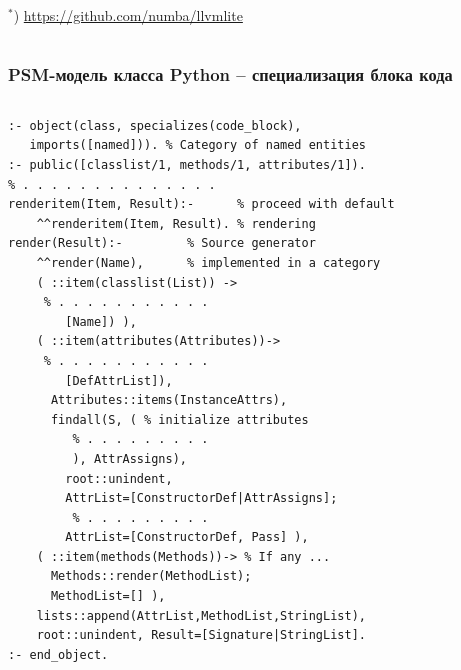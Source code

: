 \documentclass[10pt]{beamer}
\begin{document}
\begin{frame}[fragile]
\begin{columns}
\begin{column}{0.4\textwidth}
  ${}^*$) \url{https://github.com/numba/llvmlite}
    \end{column}
  \end{columns}
\end{frame}

\begin{frame}[fragile]
  \frametitle{PSM-модель класса Python -- специализация блока кода}
  \begin{columns}
    \begin{column}{0.6\textwidth}
      \flushleft
\begin{verbatim}
:- object(class, specializes(code_block),
   imports([named])). % Category of named entities
:- public([classlist/1, methods/1, attributes/1]).
% . . . . . . . . . . . . . .
renderitem(Item, Result):-      % proceed with default
    ^^renderitem(Item, Result). % rendering
render(Result):-         % Source generator
    ^^render(Name),      % implemented in a category
    ( ::item(classlist(List)) ->
     % . . . . . . . . . . .
        [Name]) ),
    ( ::item(attributes(Attributes))->
     % . . . . . . . . . . .
        [DefAttrList]),
      Attributes::items(InstanceAttrs),
      findall(S, ( % initialize attributes
         % . . . . . . . . .
         ), AttrAssigns),
        root::unindent,
        AttrList=[ConstructorDef|AttrAssigns];
         % . . . . . . . . .
        AttrList=[ConstructorDef, Pass] ),
    ( ::item(methods(Methods))-> % If any ...
      Methods::render(MethodList);
      MethodList=[] ),
    lists::append(AttrList,MethodList,StringList),
    root::unindent, Result=[Signature|StringList].
:- end_object.
\end{verbatim}
    \end{column}
    \begin{column}{0.4\linewidth}

\end{column}
\end{columns}
\end{frame}
\end{document}
